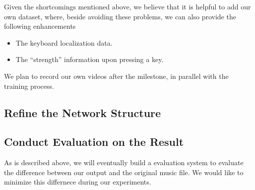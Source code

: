 \documentclass[10pt,twocolumn,letterpaper]{article}
\begin{document}
Given the shortcomings mentioned above, we believe that it is helpful to add our own dataset, where, beside avoiding these problems, we can also provide the following enhancements

\begin{itemize}
  \item The keyboard localization data.
  \item The ``strength'' information upon pressing a key.
\end{itemize}

We plan to record our own videos after the milestone, in parallel with the training process.

\subsection{Refine the Network Structure}

\subsection{Conduct Evaluation on the Result}

As is described above, we will eventually build a evaluation system to evaluate the difference between our output and the original music file. We would like to minimize this differnece during our experiments.

{\small


}
\end{document}
